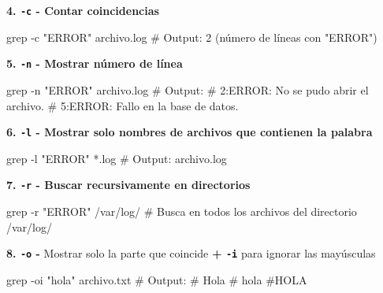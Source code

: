 \documentclass[
  spanish,
  12pt,
  letterpaper,
  DIV=11,
  numbers=noendperiod]{scrreprt}
\newenvironment{Shaded}{\begin{snugshade}}{\end{snugshade}}
\newcommand{\AttributeTok}[1]{\textcolor[rgb]{0.40,0.45,0.13}{#1}}
\newcommand{\CommentTok}[1]{\textcolor[rgb]{0.37,0.37,0.37}{#1}}
\newcommand{\FunctionTok}[1]{\textcolor[rgb]{0.28,0.35,0.67}{#1}}
\newcommand{\NormalTok}[1]{\textcolor[rgb]{0.00,0.23,0.31}{#1}}
\newcommand{\PreprocessorTok}[1]{\textcolor[rgb]{0.68,0.00,0.00}{#1}}
\newcommand{\StringTok}[1]{\textcolor[rgb]{0.13,0.47,0.30}{#1}}
\begin{document}
\textbf{4. \texttt{-c} - Contar coincidencias}

\begin{Shaded}
\begin{Highlighting}[]
\FunctionTok{grep} \AttributeTok{{-}c} \StringTok{"ERROR"}\NormalTok{ archivo.log}
\CommentTok{\# Output: 2 (número de líneas con "ERROR")}
\end{Highlighting}
\end{Shaded}

\textbf{5. \texttt{-n} - Mostrar número de línea}

\begin{Shaded}
\begin{Highlighting}[]
\FunctionTok{grep} \AttributeTok{{-}n} \StringTok{"ERROR"}\NormalTok{ archivo.log}
\CommentTok{\# Output: }
\CommentTok{\# 2:ERROR: No se pudo abrir el archivo.}
\CommentTok{\# 5:ERROR: Fallo en la base de datos.}
\end{Highlighting}
\end{Shaded}

\textbf{6. \texttt{-l} - Mostrar solo nombres de archivos que contienen
la palabra}

\begin{Shaded}
\begin{Highlighting}[]
\FunctionTok{grep} \AttributeTok{{-}l} \StringTok{"ERROR"} \PreprocessorTok{*}\NormalTok{.log}
\CommentTok{\# Output: archivo.log}
\end{Highlighting}
\end{Shaded}

\textbf{7. \texttt{-r} - Buscar recursivamente en directorios}

\begin{Shaded}
\begin{Highlighting}[]
\FunctionTok{grep} \AttributeTok{{-}r} \StringTok{"ERROR"}\NormalTok{ /var/log/}
\CommentTok{\# Busca en todos los archivos del directorio /var/log/}
\end{Highlighting}
\end{Shaded}

\textbf{8. \texttt{-o} -} Mostrar solo la parte que coincide \textbf{+
\texttt{-i}} para ignorar las mayúsculas

\begin{Shaded}
\begin{Highlighting}[]
\FunctionTok{grep} \AttributeTok{{-}oi} \StringTok{"hola"}\NormalTok{ archivo.txt}
\CommentTok{\# Output: }
\CommentTok{\# Hola}
\CommentTok{\# hola}
\CommentTok{\#HOLA}
\end{Highlighting}
\end{Shaded}
\end{document}

